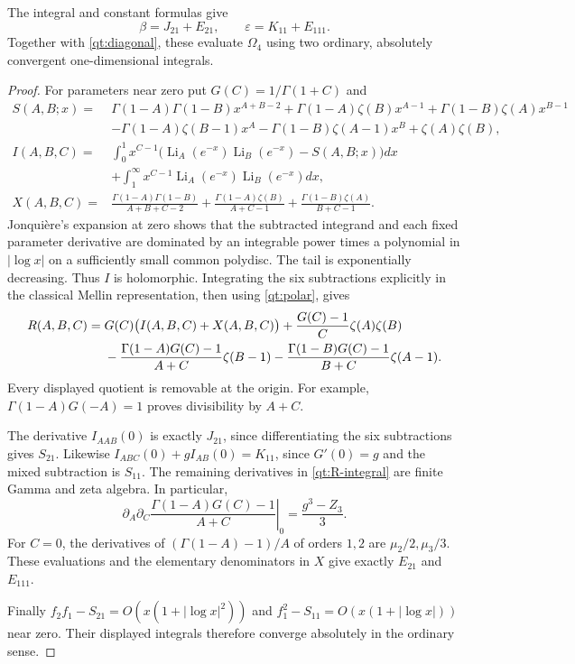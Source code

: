 \begin{proposition}\label{qt:integrals}
The integral and constant formulas give
\begin{equation}\label{qt:beta-epsilon}
 \boxed{\beta=J_{21}+E_{21},\qquad
        \varepsilon=K_{11}+E_{111}.}
\end{equation}
Together with \eqref{qt:diagonal}, these evaluate $\Omega_4$ using
two ordinary, absolutely convergent one-dimensional integrals.
\end{proposition}
\begin{proof}
For parameters near zero put $G(C)=1/\Gamma(1+C)$ and
\begin{align*}
 S(A,B;x)={}&\Gamma(1-A)\Gamma(1-B)x^{A+B-2}
 +\Gamma(1-A)\zeta(B)x^{A-1}
 +\Gamma(1-B)\zeta(A)x^{B-1}\\
 &-\Gamma(1-A)\zeta(B-1)x^A
 -\Gamma(1-B)\zeta(A-1)x^B+\zeta(A)\zeta(B),\\
 I(A,B,C)={}&\int_0^1x^{C-1}
  \bigl(\operatorname{Li}_A(e^{-x})\operatorname{Li}_B(e^{-x})-S(A,B;x)\bigr)dx\\
 &+\int_1^\infty x^{C-1}
                    \operatorname{Li}_A(e^{-x})\operatorname{Li}_B(e^{-x})dx,\\
 X(A,B,C)={}&\frac{\Gamma(1-A)\Gamma(1-B)}{A+B+C-2}
  +\frac{\Gamma(1-A)\zeta(B)}{A+C-1}
  +\frac{\Gamma(1-B)\zeta(A)}{B+C-1}.
\end{align*}
Jonqui\`ere's expansion at zero \cite[Eq.~25.12.12]{DLMFPolylog} shows that the subtracted integrand
and each fixed parameter derivative are dominated by an integrable
power times a polynomial in $|\log x|$ on a sufficiently small common
polydisc. The tail is exponentially decreasing. Thus $I$ is holomorphic.
Integrating the six subtractions explicitly in the classical Mellin
representation, then using \eqref{qt:polar}, gives
\begin{align}\label{qt:R-integral}
 R(A,B,C)={}&G(C)\bigl(I(A,B,C)+X(A,B,C)\bigr)
            +\frac{G(C)-1}{C}\zeta(A)\zeta(B)\notag\\
 &-\frac{\Gamma(1-A)G(C)-1}{A+C}\zeta(B-1)
  -\frac{\Gamma(1-B)G(C)-1}{B+C}\zeta(A-1).
\end{align}
Every displayed quotient is removable at the origin. For example,
$\Gamma(1-A)G(-A)=1$ proves divisibility by $A+C$.

The derivative $I_{AAB}(0)$ is exactly $J_{21}$, since differentiating
the six subtractions gives $S_{21}$. Likewise
$I_{ABC}(0)+gI_{AB}(0)=K_{11}$, since $G'(0)=g$ and the mixed
subtraction is $S_{11}$. The remaining derivatives in
\eqref{qt:R-integral} are finite Gamma and zeta algebra. In particular,
\[
 \left.\partial_A\partial_C
       \frac{\Gamma(1-A)G(C)-1}{A+C}\right|_0
       =\frac{g^3-Z_3}{3}.
\]
For $C=0$, the derivatives of
$(\Gamma(1-A)-1)/A$ of orders $1,2$ are $\mu_2/2,\mu_3/3$.
These evaluations and the elementary denominators in $X$ give exactly
$E_{21}$ and $E_{111}$.

Finally $f_2f_1-S_{21}=O(x(1+|\log x|^2))$ and
$f_1^2-S_{11}=O(x(1+|\log x|))$ near zero. Their displayed
integrals therefore converge absolutely in the ordinary sense.
\end{proof}

